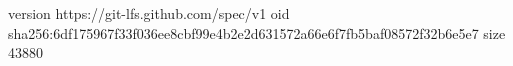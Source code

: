 version https://git-lfs.github.com/spec/v1
oid sha256:6df175967f33f036ee8cbf99e4b2e2d631572a66e6f7fb5baf08572f32b6e5e7
size 43880
